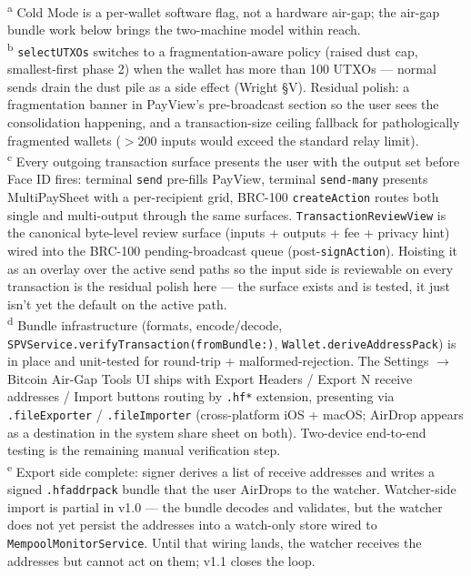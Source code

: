 \documentclass[a4paper, 11pt]{article}
\begin{document}
\begin{center}
\vspace{4pt}
\begin{minipage}{0.94\linewidth}
\small\textsuperscript{a} Cold Mode is a per-wallet software flag, not a hardware air-gap; the air-gap bundle work below brings the two-machine model within reach.\\
\textsuperscript{b} \texttt{selectUTXOs} switches to a fragmentation-aware policy (raised dust cap, smallest-first phase 2) when the wallet has more than 100 UTXOs --- normal sends drain the dust pile as a side effect (Wright \S V). Residual polish: a fragmentation banner in PayView's pre-broadcast section so the user sees the consolidation happening, and a transaction-size ceiling fallback for pathologically fragmented wallets ($>$200 inputs would exceed the standard relay limit).\\
\textsuperscript{c} Every outgoing transaction surface presents the user with the output set before Face ID fires: terminal \texttt{send} pre-fills PayView, terminal \texttt{send-many} presents MultiPaySheet with a per-recipient grid, BRC-100 \texttt{createAction} routes both single and multi-output through the same surfaces. \texttt{TransactionReviewView} is the canonical byte-level review surface (inputs + outputs + fee + privacy hint) wired into the BRC-100 pending-broadcast queue (post-\texttt{signAction}). Hoisting it as an overlay over the active send paths so the input side is reviewable on every transaction is the residual polish here --- the surface exists and is tested, it just isn't yet the default on the active path.\\
\textsuperscript{d} Bundle infrastructure (formats, encode/decode, \texttt{SPVService.verifyTransaction(fromBundle:)}, \texttt{Wallet.deriveAddressPack}) is in place and unit-tested for round-trip + malformed-rejection. The Settings $\rightarrow$ Bitcoin Air-Gap Tools UI ships with Export Headers / Export N receive addresses / Import buttons routing by \texttt{.hf*} extension, presenting via \texttt{.fileExporter} / \texttt{.fileImporter} (cross-platform iOS + macOS; AirDrop appears as a destination in the system share sheet on both). Two-device end-to-end testing is the remaining manual verification step.\\
\textsuperscript{e} Export side complete: signer derives a list of receive addresses and writes a signed \texttt{.hfaddrpack} bundle that the user AirDrops to the watcher. Watcher-side import is partial in v1.0 --- the bundle decodes and validates, but the watcher does not yet persist the addresses into a watch-only store wired to \texttt{MempoolMonitorService}. Until that wiring lands, the watcher receives the addresses but cannot act on them; v1.1 closes the loop.
\end{minipage}
\end{center}
\end{document}
